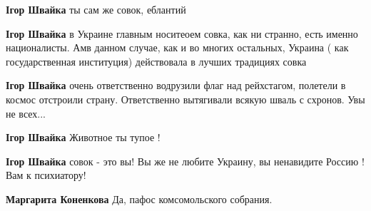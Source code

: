\begin{itemize}
\begin{itemize}
\textbf{Ігор Швайка} ты сам же совок, еблантий

 
\textbf{Ігор Швайка} в Украине главным носитеоем совка, как ни странно, есть
именно националисты. Амв данном случае, как и во многих остальных, Украина (
как государственная институция) действовала в лучших традициях совка


 
\textbf{Ігор Швайка} очень ответственно водрузили флаг над рейхстагом, полетели
в космос отстроили страну. Ответственно вытягивали всякую шваль с схронов. Увы
не всех...

 
\textbf{Ігор Швайка}
Животное ты тупое !

 
\textbf{Ігор Швайка} совок - это вы! Вы же не любите Украину, вы ненавидите Россию ! Вам к психиатору!

 
\textbf{Маргарита Коненкова} Да, пафос комсомольского собрания.

 

\end{itemize}
\end{itemize}

